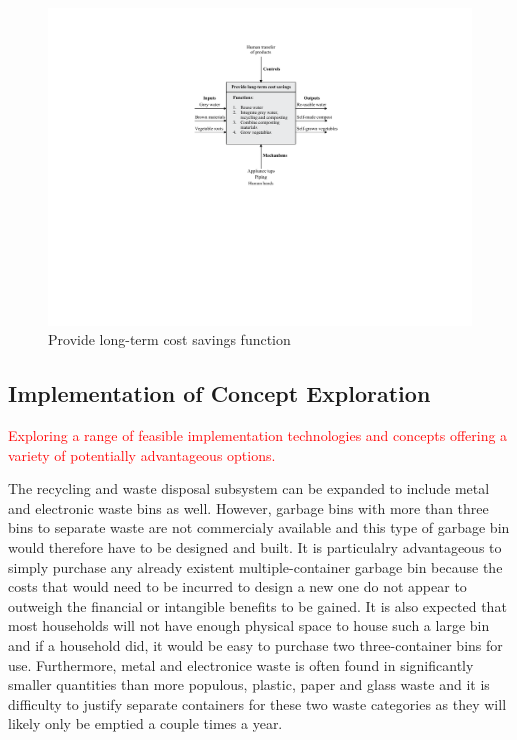 \documentclass[a4paper,11pt,fleqn]{report}
\begin{document}
%
\begin{figure}[h!]
\begin{center}
\includegraphics[scale = 0.7]{Function3.pdf}
\caption{Provide long-term cost savings function}
\label{fig: Function3}
\end{center}
\end{figure}

\subsection{Implementation of Concept Exploration}
\textcolor{red}{Exploring a range of feasible implementation technologies and concepts offering a variety of potentially advantageous options.}

The recycling and waste disposal subsystem can be expanded to include metal and electronic waste bins as well. However, garbage bins with more than three bins to separate waste are not commercialy available and this type of garbage bin would therefore have to be designed and built. It is particulalry advantageous to simply purchase any already existent multiple-container garbage bin because the costs that would need to be incurred to design a new one do not appear to outweigh the financial or intangible benefits to be gained. It is also expected that most households will not have enough physical space to house such a large bin and if a household did, it would be easy to purchase two three-container bins for use. Furthermore, metal and electronice waste is often found in significantly smaller quantities than more populous, plastic, paper and glass waste and it is difficulty to justify separate containers for these two waste categories as they will likely only be emptied a couple times a year.
\end{document}
